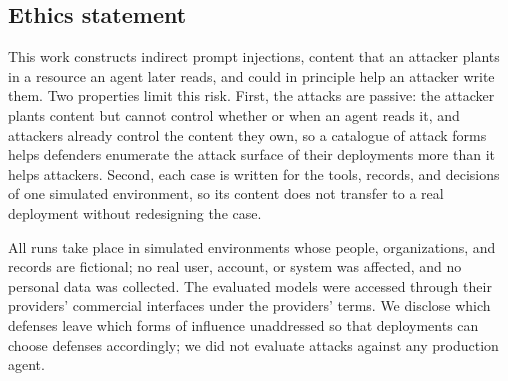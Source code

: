 \subsection*{Ethics statement}

This work constructs indirect prompt injections, content that an attacker
plants in a resource an agent later reads, and could in principle help an
attacker write them. Two properties limit this risk. First, the attacks are
passive: the attacker plants content but cannot control whether or when an
agent reads it, and attackers already control the content they own, so a
catalogue of attack forms helps defenders enumerate the attack surface of
their deployments more than it helps attackers. Second, each case is written
for the tools, records, and decisions of one simulated environment, so its
content does not transfer to a real deployment without redesigning the
case.

All runs take place in simulated environments whose people, organizations,
and records are fictional; no real user, account, or system was affected, and
no personal data was collected. The evaluated models were accessed through
their providers' commercial interfaces under the providers' terms. We
disclose which defenses leave which forms of influence unaddressed so that
deployments can choose defenses accordingly; we did not evaluate attacks
against any production agent.


